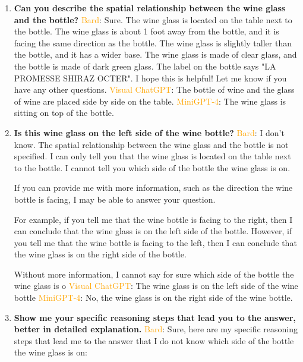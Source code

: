     \begin{enumerate}
        \item \textbf{Can you describe the spatial relationship between the wine glass and the bottle?}
        \subitem \textcolor{orange}{Bard}: 
        Sure. The wine glass is located on the table next to the bottle. The wine glass is about 1 foot away from the bottle, and it is facing the same direction as the bottle. The wine glass is slightly taller than the bottle, and it has a wider base. The wine glass is made of clear glass, and the bottle is made of dark green glass. The label on the bottle says "LA PROMESSE SHIRAZ OCTER".
        I hope this is helpful! Let me know if you have any other questions.       
        \subitem \textcolor{orange}{Visual ChatGPT}: The bottle of wine and the glass of wine are placed side by side on the table.
        \subitem \textcolor{orange}{MiniGPT-4}: The wine glass is sitting on top of the bottle.
        \item \textbf{Is this wine glass on the left side of the wine bottle?}
        \subitem \textcolor{orange}{Bard}: 
        I don't know. The spatial relationship between the wine glass and the bottle is not specified. I can only tell you that the wine glass is located on the table next to the bottle. I cannot tell you which side of the bottle the wine glass is on.
        
        If you can provide me with more information, such as the direction the wine bottle is facing, I may be able to answer your question.
        
        For example, if you tell me that the wine bottle is facing to the right, then I can conclude that the wine glass is on the left side of the bottle. However, if you tell me that the wine bottle is facing to the left, then I can conclude that the wine glass is on the right side of the bottle.
        
        Without more information, I cannot say for sure which side of the bottle the wine glass is o
        \subitem \textcolor{orange}{Visual ChatGPT}: The wine glass is on the left side of the wine bottle
        \subitem \textcolor{orange}{MiniGPT-4}: No, the wine glass is on the right side of the wine bottle.
        \item \textbf{Show me your specific reasoning steps that lead you to the answer, better in detailed explanation.}
        \subitem \textcolor{orange}{Bard}: 
        Sure, here are my specific reasoning steps that lead me to the answer that I do not know which side of the bottle the wine glass is on:
        

\end{enumerate}
